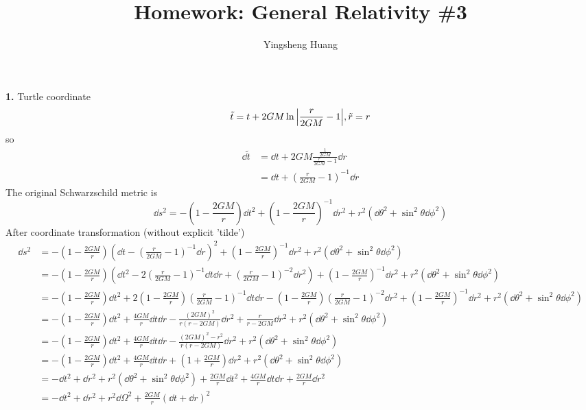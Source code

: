 \documentclass{article}
\title{Homework: General Relativity \#3}
\author{Yingsheng Huang}
\begin{document}
\maketitle
{\bf1.}\quad
Turtle coordinate
$$\tilde t=t+2GM\ln{\abs{\frac{r}{2GM}-1}},\tilde r=r$$
so
\begin{align*}
  \dd \tilde t&=\dd t+2GM\frac{{\frac{1}{2GM}}}{{\frac{r}{2GM}-1}}\dd r\\
  &=\dd t+(\frac{r}{2GM}-1)^{-1}\dd r
\end{align*}
The original Schwarzschild metric is
$$\dd s^2=-(1-\frac{2GM}{r})\dd t^2+(1-\frac{2GM}{r})^{-1}\dd r^2+r^2(\dd\theta^2+\sin^2\theta\dd\phi^2)$$
After coordinate transformation (without explicit 'tilde')
\begin{align*}
  \dd s^2&=-(1-\frac{2GM}{r})(\dd t-(\frac{r}{2GM}-1)^{-1}\dd r)^2+(1-\frac{2GM}{r})^{-1}\dd r^2+r^2(\dd\theta^2+\sin^2\theta\dd\phi^2)\\
  &=-(1-\frac{2GM}{r})(\dd t^2-2(\frac{r}{2GM}-1)^{-1}\dd t\dd r+(\frac{r}{2GM}-1)^{-2}\dd r^2)+(1-\frac{2GM}{r})^{-1}\dd r^2+r^2(\dd\theta^2+\sin^2\theta\dd\phi^2)\\
  &=-(1-\frac{2GM}{r})\dd t^2+2(1-\frac{2GM}{r})(\frac{r}{2GM}-1)^{-1}\dd t\dd r-(1-\frac{2GM}{r})(\frac{r}{2GM}-1)^{-2}\dd r^2+(1-\frac{2GM}{r})^{-1}\dd r^2+r^2(\dd\theta^2+\sin^2\theta\dd\phi^2)\\
  &=-(1-\frac{2GM}{r})\dd t^2+\frac{4GM}{r}\dd t\dd r-\frac{(2GM)^2}{r(r-2GM)}\dd r^2+\frac{r}{r-2GM}\dd r^2+r^2(\dd\theta^2+\sin^2\theta\dd\phi^2)\\
  &=-(1-\frac{2GM}{r})\dd t^2+\frac{4GM}{r}\dd t\dd r-\frac{(2GM)^2-r^2}{r(r-2GM)}\dd r^2+r^2(\dd\theta^2+\sin^2\theta\dd\phi^2)\\
  &=-(1-\frac{2GM}{r})\dd t^2+\frac{4GM}{r}\dd t\dd r+(1+\frac{2GM}{r})\dd r^2+r^2(\dd\theta^2+\sin^2\theta\dd\phi^2)\\
  &=-\dd t^2+\dd r^2+r^2(\dd\theta^2+\sin^2\theta\dd\phi^2)+\frac{2GM}{r}\dd t^2+\frac{4GM}{r}\dd t\dd r+\frac{2GM}{r}\dd r^2\\
  &=-\dd t^2+\dd r^2+r^2\dd\Omega^2+\frac{2GM}{r}(\dd t+\dd r)^2
\end{align*}
\end{document}
